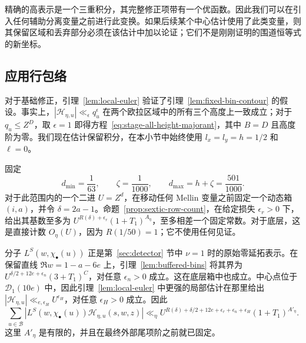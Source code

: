 \documentclass[11pt,a4paper]{article}
\numberwithin{equation}{section}
\numberwithin{figure}{section}
\theoremstyle{definition}
\theoremstyle{remark}
\begin{document}
精确的高表示是一个三重积分，其完整修正项带有一个优函数。因此我们可以在引入任何辅助分离变量之前进行此变换。如果后续某个中心估计使用了此类变量，则其保留区域和丢弃部分必须在该估计中加以论证；它们不是刚刚证明的围道恒等式的新坐标。

\subsection{应用行包络}

对于基础修正，引理~\ref{lem:local-euler} 验证了引理~\ref{lem:fixed-bin-contour} 的假设。事实上，$|\mathcal H_{\eta,u}|\ll_\epsilon q_u^\epsilon$ 在两个欧拉区域中的所有三个高度上一致成立；对于 $q_u\le Z^D$，取 $\epsilon=1$ 即得方程~\eqref{eq:stage-all-height-majorant}，其中 $B=D$ 且高度阶为零。我们现在估计保留积分，在本小节中始终使用 $l_x=l_y=h=1/2$ 和 $\ell=0$。

固定
\[
 d_{\min}=\frac1{63},\qquad \zeta=\frac1{1000},\qquad
 d_{\max}=h+\zeta=\frac{501}{1000}.
\]
对于此范围内的一个二进 $U=Z^d$，在移动任何 Mellin 变量之前固定一个动态箱 $(i,a)$，并令 $\delta=2a-1$。命题~\ref{prop:sextic-row-count}，在给定损失 $\epsilon_r>0$ 下，给出其基数至多为 $U^{R(\delta)+\epsilon_r}(1+T_1)^{A_\eta}$，至多相差一个固定常数。对于底层，这是直接计数 $O_\eta(U)$，因为 $R(1/50)=1$；它不使用任何见证。

分子 $L^S(w,\chi_\bullet(u))$ 正是第~\ref{sec:detector} 节中 $\nu=1$ 时的原始零延拓表示。在保留直线 $\Re w=1-a-6e$ 上，引理~\ref{lem:buffered-bins} 将其界为 $U^{\delta/2+12e+\epsilon_n}(3+T_1)^C$，对任意 $\epsilon_n>0$ 成立。这在底层箱中也成立。中心点位于 $\mathcal D_1(10e)$ 中，因此引理~\ref{lem:local-euler} 中更强的局部估计在那里给出 $|\mathcal H_{\eta,u}|\ll_{e,\epsilon_H}U^{\epsilon_H}$，对任意 $\epsilon_H>0$ 成立。因此
\[
 \sum_{u\in\mathcal B}
 |L^S(w,\chi_\bullet(u))\mathcal H_{\eta,u}(s,w,z)|
 \ll_\eta
 U^{R(\delta)+\delta/2+12e+\epsilon_r+\epsilon_n+\epsilon_H}
 (1+T_1)^{A'_\eta}.
\]
这里 $A'_\eta$ 是有限的，并且在最终外部尾项阶之前就已固定。
\end{document}
